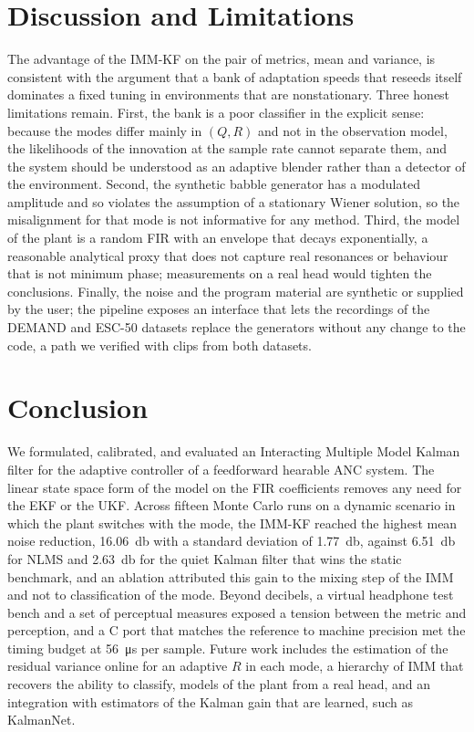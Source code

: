 \documentclass[conference]{IEEEtran}
\begin{document}
\section{Discussion and Limitations}

The advantage of the IMM-KF on the pair of metrics, mean and variance, is consistent
with the argument that a bank of adaptation speeds that reseeds itself dominates a
fixed tuning in environments that are nonstationary. Three honest limitations remain.
First, the bank is a poor classifier in the explicit sense: because the modes differ
mainly in $(Q,R)$ and not in the observation model, the likelihoods of the
innovation at the sample rate cannot separate them, and the system should be
understood as an adaptive blender rather than a detector of the environment. Second,
the synthetic babble generator has a modulated amplitude and so violates the
assumption of a stationary Wiener solution, so the misalignment for that mode is not
informative for any method. Third, the model of the plant is a random FIR with an
envelope that decays exponentially, a reasonable analytical proxy that does not
capture real resonances or behaviour that is not minimum phase; measurements on a
real head would tighten the conclusions. Finally, the noise and the program material
are synthetic or supplied by the user; the pipeline exposes an interface that lets
the recordings of the DEMAND and ESC-50 datasets replace the generators without any
change to the code, a path we verified with clips from both datasets.

\section{Conclusion}

We formulated, calibrated, and evaluated an Interacting Multiple Model Kalman filter
for the adaptive controller of a feedforward hearable ANC system. The linear state
space form of the model on the FIR coefficients removes any need for the EKF or the
UKF. Across fifteen Monte Carlo runs on a dynamic scenario in which the plant
switches with the mode, the IMM-KF reached the highest mean noise reduction,
\SI{+16.06}{\decibel} with a standard deviation of \SI{1.77}{\decibel}, against
\SI{+6.51}{\decibel} for NLMS and \SI{+2.63}{\decibel} for the quiet Kalman filter
that wins the static benchmark, and an ablation attributed this gain to the mixing
step of the IMM and not to classification of the mode. Beyond decibels, a virtual
headphone test bench and a set of perceptual measures exposed a tension between the
metric and perception, and a C port that matches the reference to machine precision
met the timing budget at \SI{56}{\micro\second} per sample. Future work includes the
estimation of the residual variance online for an adaptive $R$ in each mode, a
hierarchy of IMM that recovers the ability to classify, models of the plant from a
real head, and an integration with estimators of the Kalman gain that are learned,
such as KalmanNet.
\end{document}
